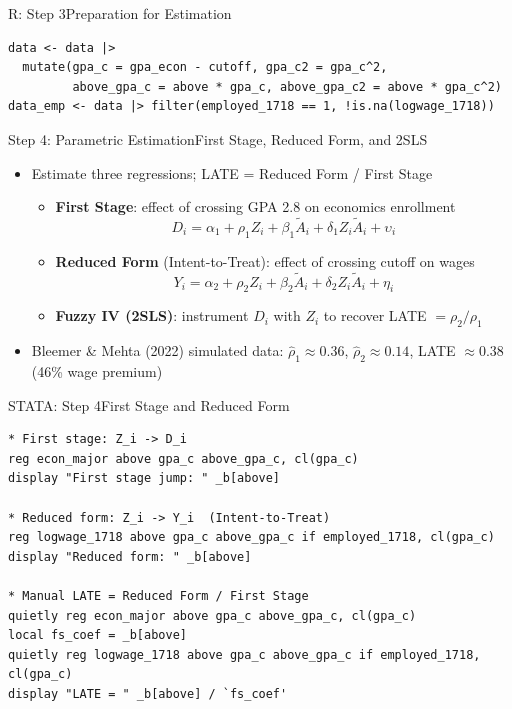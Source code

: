 \documentclass[hyperref={pdfpagelabels=false}]{beamer}
\begin{document}
\begin{frame}[fragile]{R: Step 3}{Preparation for Estimation}
\begin{lstlisting}[style=r-style]
data <- data |>
  mutate(gpa_c = gpa_econ - cutoff, gpa_c2 = gpa_c^2,
         above_gpa_c = above * gpa_c, above_gpa_c2 = above * gpa_c^2)
data_emp <- data |> filter(employed_1718 == 1, !is.na(logwage_1718))
\end{lstlisting}
\end{frame}


\begin{frame}{Step 4: Parametric Estimation}{First Stage, Reduced Form, and 2SLS}
	\begin{itemize}
		\item Estimate three regressions; LATE = Reduced Form / First Stage
		\vspace{0.2cm}
		\begin{itemize}
			\item \textbf{First Stage}: effect of crossing GPA 2.8 on economics enrollment
			\begin{equation*}
				D_i = \alpha_1 + \rho_1 Z_i + \beta_1\tilde{A}_i + \delta_1 Z_i\tilde{A}_i + \upsilon_i
			\end{equation*}
			\vspace{0.1cm}
			\item \textbf{Reduced Form} (Intent-to-Treat): effect of crossing cutoff on wages
			\begin{equation*}
				Y_i = \alpha_2 + \rho_2 Z_i + \beta_2\tilde{A}_i + \delta_2 Z_i\tilde{A}_i + \eta_i
			\end{equation*}
			\vspace{0.1cm}
			\item \textbf{Fuzzy IV (2SLS)}: instrument $D_i$ with $Z_i$ to recover LATE $= \rho_2/\rho_1$
		\end{itemize}
		\vspace{0.2cm}
		\item Bleemer \& Mehta (2022) simulated data:
		$\hat{\rho}_1 \approx 0.36$, $\hat{\rho}_2 \approx 0.14$,
		LATE $\approx 0.38$ (46\% wage premium)
	\end{itemize}
\end{frame}


\begin{frame}[fragile]{STATA: Step 4}{First Stage and Reduced Form}
\begin{lstlisting}
* First stage: Z_i -> D_i
reg econ_major above gpa_c above_gpa_c, cl(gpa_c)
display "First stage jump: " _b[above]

* Reduced form: Z_i -> Y_i  (Intent-to-Treat)
reg logwage_1718 above gpa_c above_gpa_c if employed_1718, cl(gpa_c)
display "Reduced form: " _b[above]

* Manual LATE = Reduced Form / First Stage
quietly reg econ_major above gpa_c above_gpa_c, cl(gpa_c)
local fs_coef = _b[above]
quietly reg logwage_1718 above gpa_c above_gpa_c if employed_1718, cl(gpa_c)
display "LATE = " _b[above] / `fs_coef'
\end{lstlisting}
\end{frame}
\end{document}
